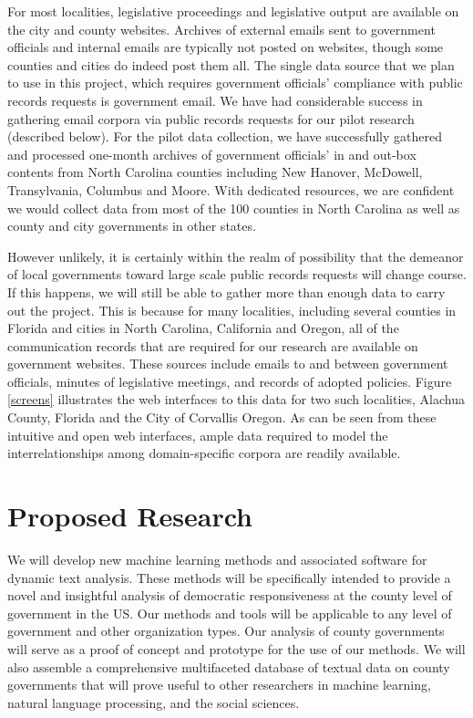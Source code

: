   For most localities, legislative proceedings and legislative output are available on the city and county websites. Archives of external emails sent to government officials and internal emails are typically not posted on websites, though some counties and cities do indeed post them all. The single data source that we plan to use in this project, which requires government officials' compliance with public records requests is government email. We have had considerable success in gathering email corpora via public records requests for our pilot research (described below). For the pilot data collection, we have successfully gathered and processed one-month archives of government officials' in and out-box contents from North Carolina counties including New Hanover, McDowell, Transylvania, Columbus and Moore. With dedicated resources, we are confident we would collect data from most of the 100 counties in North Carolina as well as county and city governments in other states. 

 However unlikely, it is certainly within the realm of possibility that the demeanor of local governments toward large scale public records requests will change course. If this happens, we will still be able to gather more than enough data to carry out the project. This is because for many localities, including several counties in Florida and cities in North Carolina, California and Oregon, all of the communication records that are required for our research are available on government websites. These sources include emails to and between government officials, minutes of legislative meetings, and records of adopted policies. Figure \ref{screens} illustrates the web interfaces to this data for two such localities, Alachua County, Florida and the City of Corvallis Oregon. As can be seen from these intuitive and open web interfaces, ample data required to model the interrelationships among domain-specific corpora are readily available.


\section{Proposed Research}

We will develop new machine learning methods and associated software
for dynamic text analysis. These methods will be specifically intended
to provide a novel and insightful analysis of democratic
responsiveness at the county level of government in the US. Our
methods and tools will be applicable to any level of government and
other organization types. Our analysis of county governments will
serve as a proof of concept and prototype for the use of our
methods. We will also assemble a comprehensive multifaceted database
of textual data on county governments that will prove useful to other
researchers in machine learning, natural language processing, and the
social sciences.

